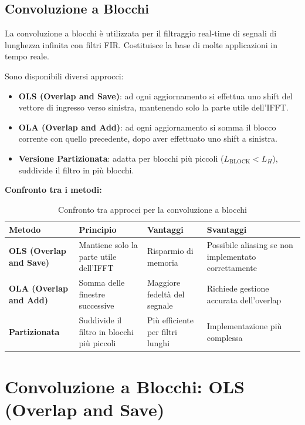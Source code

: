 \subsection*{Convoluzione a Blocchi}

La convoluzione a blocchi è utilizzata per il filtraggio real-time di segnali di lunghezza infinita con filtri FIR. Costituisce la base di molte applicazioni in tempo reale.

\medskip

Sono disponibili diversi approcci:

\begin{itemize}
    \item \textbf{OLS (Overlap and Save)}: ad ogni aggiornamento si effettua uno shift del vettore di ingresso verso sinistra, mantenendo solo la parte utile dell'IFFT.
    \item \textbf{OLA (Overlap and Add)}: ad ogni aggiornamento si somma il blocco corrente con quello precedente, dopo aver effettuato uno shift a sinistra.
    \item \textbf{Versione Partizionata}: adatta per blocchi più piccoli (\(L_{\text{BLOCK}} < L_H\)), suddivide il filtro in più blocchi.
\end{itemize}
\textbf{Confronto tra i metodi:}

\begin{table}[H]
\centering
\begin{tabularx}{\textwidth}{|X|X|X|X|}
\hline
\textbf{Metodo} & \textbf{Principio} & \textbf{Vantaggi} & \textbf{Svantaggi} \\
\hline
\textbf{OLS (Overlap and Save)} & Mantiene solo la parte utile dell'IFFT & Risparmio di memoria & Possibile aliasing se non implementato correttamente \\
\hline
\textbf{OLA (Overlap and Add)} & Somma delle finestre successive & Maggiore fedeltà del segnale & Richiede gestione accurata dell'overlap \\
\hline
\textbf{Partizionata} & Suddivide il filtro in blocchi più piccoli & Più efficiente per filtri lunghi & Implementazione più complessa \\
\hline
\end{tabularx}
\caption{Confronto tra approcci per la convoluzione a blocchi}
\end{table}

\section{Convoluzione a Blocchi: OLS (Overlap and Save)}

